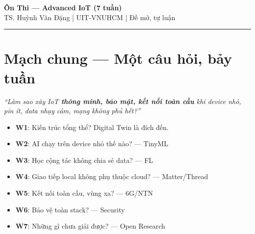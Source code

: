 \documentclass[9pt,a4paper,twocolumn]{article}
\begin{document}

\begin{center}
  {\large\bfseries Ôn Thi --- Advanced IoT (7 tuần)}\\[1pt]
  {\footnotesize TS. Huỳnh Văn Đặng | UIT-VNUHCM | Đề mở, tự luận}
\end{center}
\vspace{-4pt}
\hrule
\vspace{4pt}

\section*{Mạch chung --- Một câu hỏi, bảy tuần}

\textit{``Làm sao xây IoT \textbf{thông minh, bảo mật, kết nối toàn cầu} khi device nhỏ,
pin ít, data nhạy cảm, mạng không phủ hết?''}

\begin{itemize}
  \item \textbf{W1}: Kiến trúc tổng thể? Digital Twin là đích đến.
  \item \textbf{W2}: AI chạy trên device nhỏ thế nào? --- TinyML
  \item \textbf{W3}: Học cộng tác không chia sẻ data? --- FL
  \item \textbf{W4}: Giao tiếp local không phụ thuộc cloud? --- Matter/Thread
  \item \textbf{W5}: Kết nối toàn cầu, vùng xa? --- 6G/NTN
  \item \textbf{W6}: Bảo vệ toàn stack? --- Security
  \item \textbf{W7}: Những gì chưa giải được? --- Open Research
\end{itemize}
\end{document}
